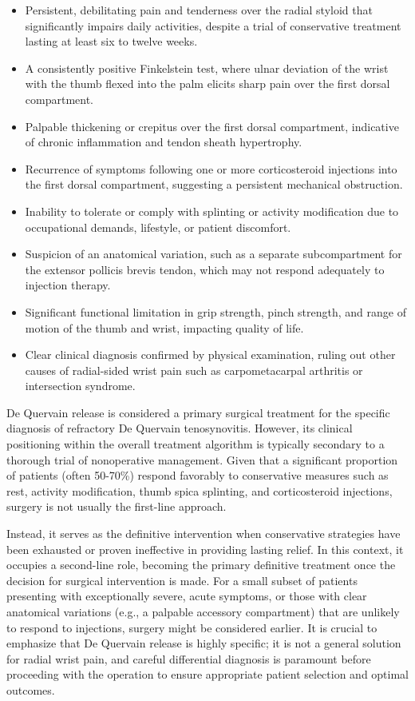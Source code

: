\begin{itemize}
  \item Persistent, debilitating pain and tenderness over the radial styloid that significantly impairs daily activities, despite a trial of conservative treatment lasting at least six to twelve weeks.
  \item A consistently positive Finkelstein test, where ulnar deviation of the wrist with the thumb flexed into the palm elicits sharp pain over the first dorsal compartment.
  \item Palpable thickening or crepitus over the first dorsal compartment, indicative of chronic inflammation and tendon sheath hypertrophy.
  \item Recurrence of symptoms following one or more corticosteroid injections into the first dorsal compartment, suggesting a persistent mechanical obstruction.
  \item Inability to tolerate or comply with splinting or activity modification due to occupational demands, lifestyle, or patient discomfort.
  \item Suspicion of an anatomical variation, such as a separate subcompartment for the extensor pollicis brevis tendon, which may not respond adequately to injection therapy.
  \item Significant functional limitation in grip strength, pinch strength, and range of motion of the thumb and wrist, impacting quality of life.
  \item Clear clinical diagnosis confirmed by physical examination, ruling out other causes of radial-sided wrist pain such as carpometacarpal arthritis or intersection syndrome.
\end{itemize}

De Quervain release is considered a primary surgical treatment for the specific diagnosis of refractory De Quervain tenosynovitis. However, its clinical positioning within the overall treatment algorithm is typically secondary to a thorough trial of nonoperative management. Given that a significant proportion of patients (often 50-70\%) respond favorably to conservative measures such as rest, activity modification, thumb spica splinting, and corticosteroid injections, surgery is not usually the first-line approach.

Instead, it serves as the definitive intervention when conservative strategies have been exhausted or proven ineffective in providing lasting relief. In this context, it occupies a second-line role, becoming the primary definitive treatment once the decision for surgical intervention is made. For a small subset of patients presenting with exceptionally severe, acute symptoms, or those with clear anatomical variations (e.g., a palpable accessory compartment) that are unlikely to respond to injections, surgery might be considered earlier. It is crucial to emphasize that De Quervain release is highly specific; it is not a general solution for radial wrist pain, and careful differential diagnosis is paramount before proceeding with the operation to ensure appropriate patient selection and optimal outcomes.

